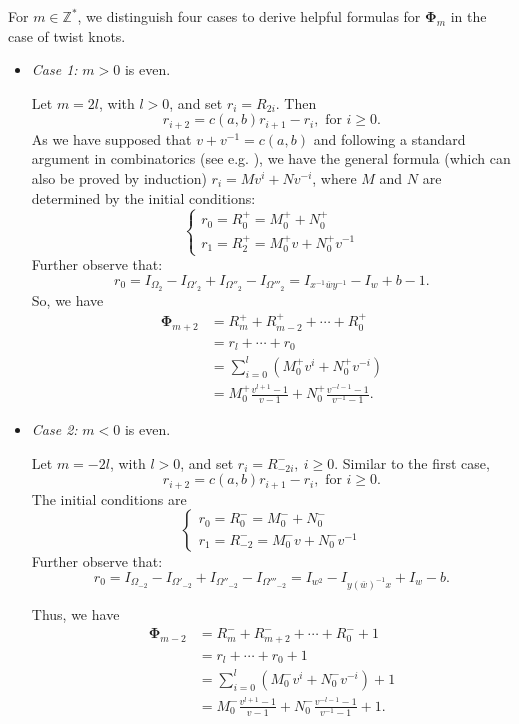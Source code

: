 \documentclass[a4paper]{amsart}
\theoremstyle{plain}
\theoremstyle{definition}
\theoremstyle{remark}
\newcommand{\ZZ}{{\mathbb Z}}
\begin{document}
For $m \in \ZZ^*$, we distinguish four cases to derive helpful formulas for ${\mathbf\Phi}_m$ in the case of twist knots. 
\begin{itemize}
  \item {\it Case 1:} $m > 0$ is even. 

Let $m=2l$, with $l > 0$, and set $r_i=R_{2i}$. Then 
$$r_{i+2}=c(a,b)r_{i+1}-r_i, \text{ for } i\geqslant 0.$$
 As we have supposed that $v+v^{-1}=c(a,b)$ and following a standard argument in combinatorics (see e.g. \cite[p. 322]{Merris:2003}), we have the general formula (which can also be proved by induction) $r_i=Mv^i+Nv^{-i}$, where $M$ and $N$ are determined by the initial conditions:
\[
\begin{cases}
      r_0=R^+_0=M^+_0+N^+_0  \\
      r_1=R^+_2=M^+_0v+N^+_0v^{-1} 
\end{cases}
\] 
Further observe that:
\[
r_0 = I_{\Omega_2} - I_{\Omega'_2} + I_{\Omega''_2}- I_{\Omega'''_2} = I_{x^{-1}\overline{w}y^{-1}} - I_w + b - 1.
\]
So, we have
\begin{equation*}\begin{split}{\mathbf\Phi}_{m+2}&=R^+_m+R^+_{m-2}+\dotsb+R^+_0\\
&= r_l + \dotsb + r_0\\
&=\sum_{i=0}^l (M^+_0v^i+N^+_0v^{-i})\\&=M^+_0\frac{v^{l+1}-1}{v-1}+N^+_0\frac{v^{-l-1}-1}{v^{-1}-1}.
\end{split}\end{equation*}


  \item {\it Case 2:} $m < 0$ is even. 

Let $m= - 2l$, with $l > 0$, and set $r_i=R^-_{-2i},\ i\geqslant 0$. Similar to the first case, 
$$r_{i+2}=c(a,b)r_{i+1}-r_i, \text{ for } i\geqslant 0.$$ 
The initial conditions are
\[
\begin{cases}
      r_0=R^-_0=M^-_0+N^-_0  \\
      r_1=R^-_{-2}=M^-_0v+N^-_0v^{-1}
\end{cases}
\] 
Further observe that:
\[
r_0 = I_{\Omega_{-2}} - I_{\Omega'_{-2}} + I_{\Omega''_{-2}}- I_{\Omega'''_{-2}} = I_{w^{2}} - I_{y (\overline{w})^{-1}x} + I_w - b.
\]


Thus, we have
\begin{equation*}\begin{split}{\mathbf\Phi}_{m-2}&=R^-_m+R^-_{m+2}+\dotsb+R^-_{0}+1\\
&= r_l + \dotsb + r_0+1\\
&=\sum_{i=0}^l (M^-_0v^i+N^-_0v^{-i})+1\\&=M^-_0\frac{v^{l+1}-1}{v-1}+N^-_0\frac{v^{-l-1}-1}{v^{-1}-1}+1.
\end{split}\end{equation*}



\end{itemize}
\end{document}
